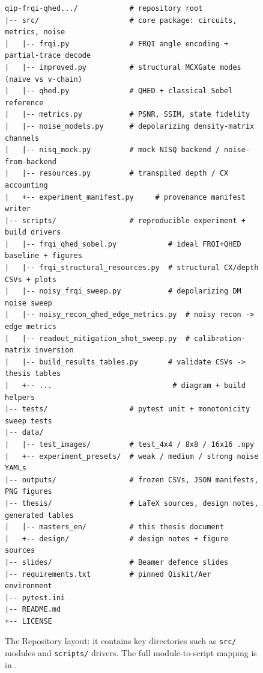 \begin{figure}[H]
\centering
\begin{lstlisting}[language={}, basicstyle=\ttfamily\scriptsize, frame=single, breaklines=false, numbers=none, xleftmargin=0pt, framexleftmargin=4pt, columns=fixed]
qip-frqi-qhed.../            # repository root
|-- src/                     # core package: circuits, metrics, noise
|   |-- frqi.py              # FRQI angle encoding + partial-trace decode
|   |-- improved.py          # structural MCXGate modes (naive vs v-chain)
|   |-- qhed.py              # QHED + classical Sobel reference
|   |-- metrics.py           # PSNR, SSIM, state fidelity
|   |-- noise_models.py      # depolarizing density-matrix channels
|   |-- nisq_mock.py         # mock NISQ backend / noise-from-backend
|   |-- resources.py         # transpiled depth / CX accounting
|   +-- experiment_manifest.py     # provenance manifest writer
|-- scripts/                 # reproducible experiment + build drivers
|   |-- frqi_qhed_sobel.py            # ideal FRQI+QHED baseline + figures
|   |-- frqi_structural_resources.py  # structural CX/depth CSVs + plots
|   |-- noisy_frqi_sweep.py           # depolarizing DM noise sweep
|   |-- noisy_recon_qhed_edge_metrics.py  # noisy recon -> edge metrics
|   |-- readout_mitigation_shot_sweep.py  # calibration-matrix inversion
|   |-- build_results_tables.py       # validate CSVs -> thesis tables
|   +-- ...                            # diagram + build helpers
|-- tests/                   # pytest unit + monotonicity sweep tests
|-- data/
|   |-- test_images/         # test_4x4 / 8x8 / 16x16 .npy
|   +-- experiment_presets/  # weak / medium / strong noise YAMLs
|-- outputs/                 # frozen CSVs, JSON manifests, PNG figures
|-- thesis/                  # LaTeX sources, design notes, generated tables
|   |-- masters_en/          # this thesis document
|   +-- design/              # design notes + figure sources
|-- slides/                  # Beamer defence slides
|-- requirements.txt         # pinned Qiskit/Aer environment
|-- pytest.ini
|-- README.md
+-- LICENSE
\end{lstlisting}
\caption{The Repository layout: it contains key directories such as \texttt{src/} modules and \texttt{scripts/} drivers. The full module-to-script mapping is in .}
\label{fig:repo-tree}
\end{figure}

